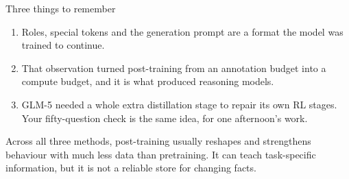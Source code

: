 \documentclass[aspectratio=169,10pt]{beamer}
\begin{document}

\begin{frame}{Three things to remember}
  \begin{enumerate}
    \item {} Roles, special tokens and the generation prompt are a format
      the model was trained to continue.
      \vspace{0.6em}
    \item {}
      That observation turned post-training from an annotation budget into a
      compute budget, and it is what produced reasoning models.
      \vspace{0.6em}
    \item {} GLM-5 needed a whole extra distillation stage to repair its
      own RL stages. Your fifty-question check is the same idea, for one
      afternoon's work.
  \end{enumerate}
  \vfill
  \small
  Across all three methods, post-training usually reshapes and strengthens
  behaviour with much less data than pretraining. It can teach task-specific
  information, but it is not a reliable store for changing facts.
\end{frame}
\end{document}
